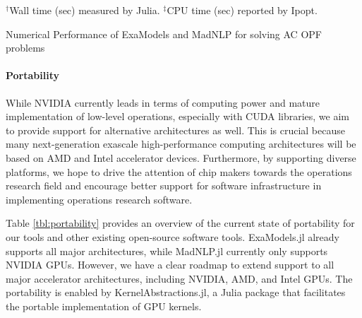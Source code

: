  
\begin{table}[t]
  \begin{center}
    
    \vspace{-1em}
    \footnotesize
    $^\dag$Wall time (sec) measured by Julia. $^\ddag$CPU time (sec) reported by Ipopt.  
  \end{center}
  \caption{Numerical Performance of ExaModels and MadNLP for solving AC OPF problems}
  \label{tab:num}
\end{table}

\paragraph{Portability}


While NVIDIA currently leads in terms of computing power and mature
implementation of low-level operations, especially with CUDA
libraries, we aim to provide support for alternative architectures as
well. This is crucial because many next-generation exascale
high-performance computing architectures will be based on AMD and
Intel accelerator devices. Furthermore, by supporting diverse
platforms, we hope to drive the attention of chip makers towards the
operations research field and encourage better support for software
infrastructure in implementing operations research software.

Table \ref{tbl:portability} provides an overview of the current state
of portability for our tools and other existing open-source software
tools. ExaModels.jl already supports all major architectures, while
MadNLP.jl currently only supports NVIDIA GPUs. However, we have a
clear roadmap to extend support to all major accelerator
architectures, including NVIDIA, AMD, and Intel GPUs. The portability
is enabled by KernelAbstractions.jl, a Julia package that facilitates
the portable implementation of GPU kernels. 

\begin{table}[t]
  \begin{center}
  \end{center}
  \caption{The current status on the portability of the NLP frameworks.}
  \label{tbl:portability}
\end{table}

